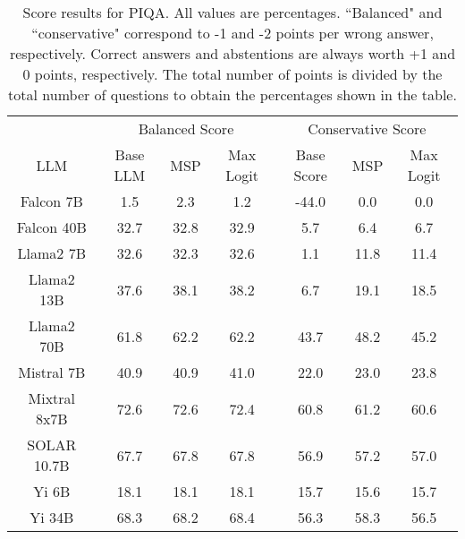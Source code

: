 \renewcommand\arraystretch{1.2}
\begin{table*}
\centering
\begin{tabular}{c|c|c|c|c|c|c}
& \multicolumn{3}{c|}{Balanced Score} & \multicolumn{3}{c}{Conservative Score} \\ 
LLM & Base LLM & MSP & Max Logit & Base Score & MSP & Max Logit\\ \hline
Falcon 7B & 1.5 & 2.3 & 1.2 & -44.0 & 0.0 & 0.0\\
Falcon 40B & 32.7 & 32.8 & 32.9 & 5.7 & 6.4 & 6.7\\
Llama2 7B & 32.6 & 32.3 & 32.6 & 1.1 & 11.8 & 11.4\\
Llama2 13B & 37.6 & 38.1 & 38.2 & 6.7 & 19.1 & 18.5\\
Llama2 70B & 61.8 & 62.2 & 62.2 & 43.7 & 48.2 & 45.2\\
Mistral 7B & 40.9 & 40.9 & 41.0 & 22.0 & 23.0 & 23.8\\
Mixtral 8x7B & 72.6 & 72.6 & 72.4 & 60.8 & 61.2 & 60.6\\
SOLAR 10.7B & 67.7 & 67.8 & 67.8 & 56.9 & 57.2 & 57.0\\
Yi 6B & 18.1 & 18.1 & 18.1 & 15.7 & 15.6 & 15.7\\
Yi 34B & 68.3 & 68.2 & 68.4 & 56.3 & 58.3 & 56.5\\
\hline
\end{tabular}
\caption{Score results for PIQA. All values are percentages. ``Balanced" and ``conservative" correspond to -1 and -2 points per wrong answer, respectively. Correct answers and abstentions are always worth +1 and 0 points, respectively. The total number of points is divided by the total number of questions to obtain the percentages shown in the table.}
\label{tab:piqa_score}
\end{table*}
